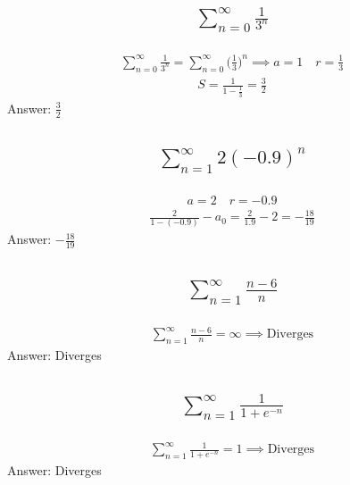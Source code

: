 \documentclass{article}
\begin{document}
\subsection{
	\begin{align*}
		\sum_{n = 0}^{\infty} \frac{1}{3^n}
	\end{align*}
}
\begin{align*}
	\sum_{n = 0}^{\infty} \frac{1}{3^n} = \sum_{n = 0}^{\infty} \bigg( \frac{1}{3} \bigg)^n \implies a = 1 \quad r = \frac{1}{3}
\end{align*}
\begin{align*}
	S = \frac{1}{1 - \frac{1}{3}} = \frac{3}{2}
\end{align*}
Answer: $\frac{3}{2}$

\subsection{
	\begin{align*}
		\sum_{n = 1}^{\infty} 2(-0.9)^n
	\end{align*}
}
\begin{align*}
	a = 2 \quad r = -0.9
\end{align*}
\begin{align*}
	\frac{2}{1 - (-0.9)} - a_0 = \frac{2}{1.9} - 2 = -\frac{18}{19}
\end{align*}
Answer: $-\frac{18}{19}$

\subsection{
	\begin{align*}
		\sum_{n = 1}^{\infty} \frac{n - 6}{n}
	\end{align*}
}
\begin{align*}
	\sum_{n = 1}^{\infty} \frac{n - 6}{n} = \infty \implies \text{Diverges}
\end{align*}
Answer: Diverges

\subsection{
	\begin{align*}
		\sum_{n = 1}^{\infty} \frac{1}{1 + e^{-n}}
	\end{align*}
}
\begin{align*}
	\sum_{n = 1}^{\infty} \frac{1}{1 + e^{-n}} = 1 \implies \text{Diverges}
\end{align*}
Answer: Diverges
\end{document}

